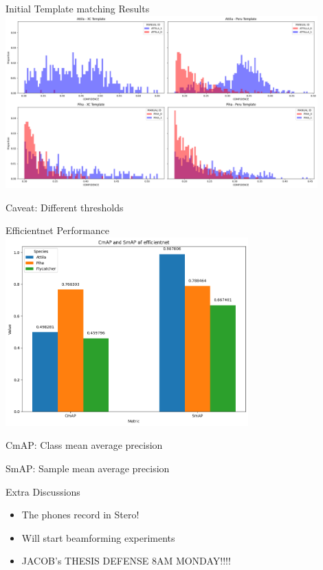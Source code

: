 \begin{frame}{Initial Template matching Results}
    \centering
    \includegraphics[height=0.9\textheight,width=0.9\textwidth,keepaspectratio]{images/conf_dists.png}

    Caveat: Different thresholds
\end{frame}

\begin{frame}{Efficientnet Performance}
    \centering
    \includegraphics[height=0.7\textheight,width=0.7\textwidth,keepaspectratio]{images/cmap_smap_3species.png}

    CmAP: Class mean average precision

    SmAP: Sample mean average precision
\end{frame}

\begin{frame}{Extra Discussions}
    \begin{itemize}
        \item The phones record in Stero!
        \item Will start beamforming experiments
        \item JACOB's THESIS DEFENSE 8AM MONDAY!!!!
    \end{itemize}
\end{frame}

